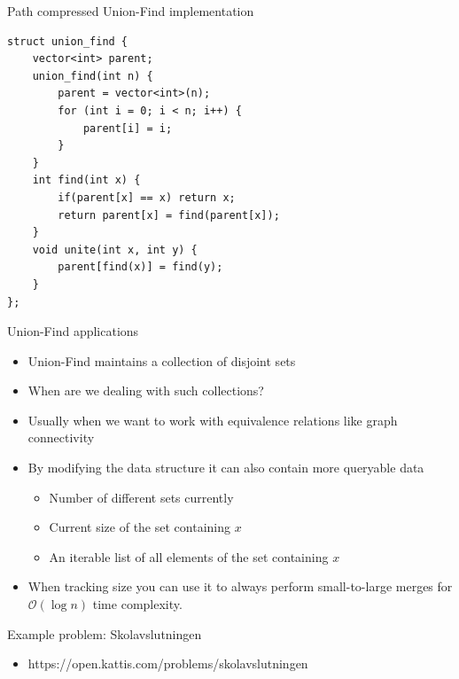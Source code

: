 \documentclass{beamer}
\begin{document}
\begin{frame}{Path compressed Union-Find implementation}
    \begin{verbatim}
struct union_find {
    vector<int> parent;
    union_find(int n) {
        parent = vector<int>(n);
        for (int i = 0; i < n; i++) {
            parent[i] = i;
        }
    }
    int find(int x) {
        if(parent[x] == x) return x;
        return parent[x] = find(parent[x]);
    }
    void unite(int x, int y) {
        parent[find(x)] = find(y);
    }
};
    \end{verbatim}
\end{frame}

\begin{frame}[plain]{Union-Find applications}
    \vspace{30pt}
    \begin{itemize}
        \item<1-> Union-Find maintains a collection of disjoint sets
        \item<1-> When are we dealing with such collections?
        \item<2-> Usually when we want to work with equivalence relations like graph connectivity
        \item<2-> By modifying the data structure it can also contain more queryable data
        \begin{itemize}
            \item<2-> Number of different sets currently
            \item<2-> Current size of the set containing $x$
            \item<2-> An iterable list of all elements of the set containing $x$
        \end{itemize}
        \item<3-> When tracking size you can use it to always perform small-to-large merges for $\mathcal{O}(\log n)$ time complexity.
    \end{itemize}
\end{frame}

\begin{frame}[plain]{Example problem: Skolavslutningen}
    \begin{itemize}
        \item https://open.kattis.com/problems/skolavslutningen
    \end{itemize}
\end{frame}
\end{document}
